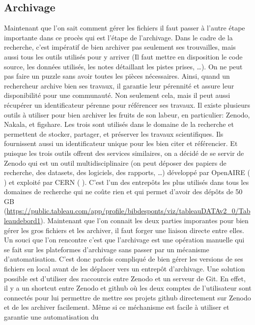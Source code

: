 \documentclass[11pt]{article}
\begin{document}
\subsection{Archivage}
\label{sec:org9dc43af}
Maintenant que l'on sait comment gérer les fichiers il faut passer à
l'autre étape importante dans ce procès qui est l'étape de
l'archivage. Dans le cadre de la recherche, c’est impératif de bien
archiver pas seulement ses trouvailles, mais aussi tous les outils
utilisés pour y arriver (Il faut mettre en disposition le code source,
les données utilisés, les notes détaillant les pistes prises, …). On
ne peut pas faire un puzzle sans avoir toutes les pièces
nécessaires. Ainsi, quand un rechercheur archive bien ses travaux, il
garantie leur pérennité et assure leur disponibilité pour une
communauté. Non seulement cela, mais il peut aussi récupérer un
identificateur pérenne pour référencer ses travaux. Il existe
plusieurs outils à utiliser pour bien archiver les fruits de son
labeur, en particulier: Zenodo, Nakala, et figshare. Les trois sont
utilisés dans le domaine de la recherche et permettent de stocker,
partager, et préserver les travaux scientifiques. Ils fournissent
aussi un identificateur unique pour les bien citer et référencier.  Et
puisque les trois outils offrent des services similaires, on a décidé
de se servir de Zenodo qui est un outil multidisciplinaire (on peut
déposer des papiers de recherche, des datasets, des logiciels, des
rapports, \ldots{}) développé par OpenAIRE ( ) et exploité par CERN ( ).
C’est l’un des entrepôts les plus utilisés dans tous les domaines de
recherche qui ne coûte rien et qui permet d’avoir des dépôts de 50 GB
(\url{https://public.tableau.com/app/profile/bibdesponts/viz/tableauDATAv2\_0/Tableaudebord1}).
Maintenant que l’on connait les deux parties imporantes pour bien
gérer les gros fichiers et les archiver, il faut forger une liaison
directe entre elles. Un souci que l’on rencontre c’est que l’archivage
est une opération manuelle qui se fait sur les plateformes d’archivage
sans passer par un mécanisme d’automatisation. C’est donc parfois
compliqué de bien gérer les versions de ses fichiers en local avant de
les déplacer vers un entrepôt d’archivage. Une solution possible est
d’utiliser des raccourcis entre Zenodo et un serveur de Git. En effet,
il y a un shortcut entre Zenodo et github où les deux comptes de
l'utilisateur sont connectés pour lui permettre de mettre ses projets
github directement sur Zenodo et de les archiver facilement. Même si
ce méchanisme est facile à utiliser et garantie une automatisation du
\end{document}
